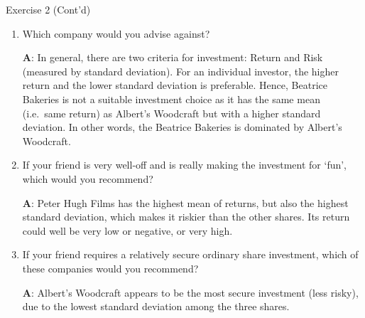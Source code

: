 \documentclass[
  ignorenonframetext,
  aspectratio=43,
]{beamer}
\let\olditem\item
\renewcommand\item{\olditem\justifying}
\begin{document}
\begin{frame}{Exercise 2 (Cont'd)}
\protect\hypertarget{exercise-2-contd}{}
\begin{enumerate}
\item
  Which company would you advise against?

  \pause

  \textbf{A}: In general, there are two criteria for investment: Return
  and Risk (measured by standard deviation). For an individual investor,
  the higher return and the lower standard deviation is preferable.
  Hence, Beatrice Bakeries is not a suitable investment choice as it has
  the same mean (i.e.~same return) as Albert's Woodcraft but with a
  higher standard deviation. In other words, the Beatrice Bakeries is
  dominated by Albert's Woodcraft.
\end{enumerate}
\end{frame}

\begin{frame}{}
\protect\hypertarget{section-3}{}
\begin{enumerate}
\setcounter{enumi}{1}
\item
  If your friend is very well-off and is really making the investment
  for `fun', which would you recommend?

  \pause

  \textbf{A}: Peter Hugh Films has the highest mean of returns, but also
  the highest standard deviation, which makes it riskier than the other
  shares. Its return could well be very low or negative, or very high.
\end{enumerate}
\end{frame}

\begin{frame}{}
\protect\hypertarget{section-4}{}
\begin{enumerate}
\setcounter{enumi}{2}
\item
  If your friend requires a relatively secure ordinary share investment,
  which of these companies would you recommend? \vspace{5pt}

  \pause

  \vspace{-5pt}

  \textbf{A}: Albert's Woodcraft appears to be the most secure
  investment (less risky), due to the lowest standard deviation among
  the three shares.
\end{enumerate}
\end{frame}
\end{document}
